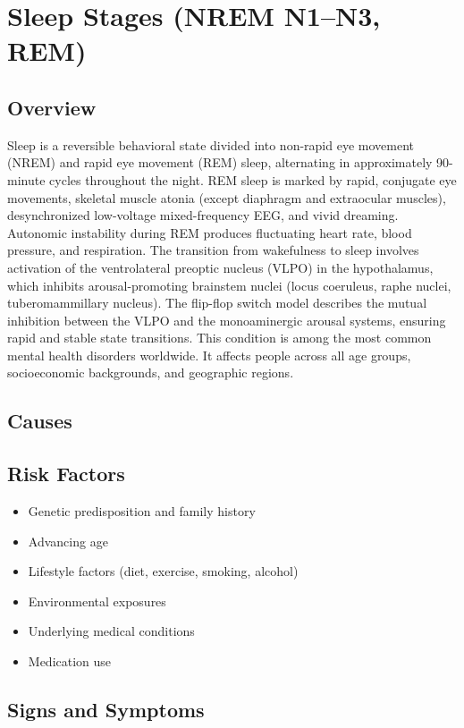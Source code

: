 \chapter{Sleep Stages (NREM N1--N3, REM)}
\label{sec:Sleep Stages}

\section{Overview}
Sleep is a reversible behavioral state divided into non-rapid eye movement (NREM) and rapid eye movement (REM) sleep, alternating in approximately 90-minute cycles throughout the night. REM sleep is marked by rapid, conjugate eye movements, skeletal muscle atonia (except diaphragm and extraocular muscles), desynchronized low-voltage mixed-frequency EEG, and vivid dreaming. Autonomic instability during REM produces fluctuating heart rate, blood pressure, and respiration. The transition from wakefulness to sleep involves activation of the ventrolateral preoptic nucleus (VLPO) in the hypothalamus, which inhibits arousal-promoting brainstem nuclei (locus coeruleus, raphe nuclei, tuberomammillary nucleus). The flip-flop switch model describes the mutual inhibition between the VLPO and the monoaminergic arousal systems, ensuring rapid and stable state transitions. This condition is among the most common mental health disorders worldwide. It affects people across all age groups, socioeconomic backgrounds, and geographic regions.
\section{Causes}
\section{Risk Factors}

\begin{itemize}[noitemsep]
  \item Genetic predisposition and family history
  \item Advancing age
  \item Lifestyle factors (diet, exercise, smoking, alcohol)
  \item Environmental exposures
  \item Underlying medical conditions
  \item Medication use
\end{itemize}
\section{Signs and Symptoms}

